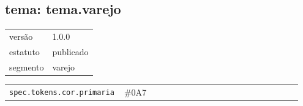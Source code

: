 \subsection*{tema: tema.varejo}
\begin{tabular}{@{}ll@{}}
versão & 1.0.0 \\
estatuto & publicado \\
segmento & varejo \\
\end{tabular}

\begin{tabular}{@{}p{0.35\linewidth}p{0.6\linewidth}@{}}
\texttt{spec.tokens.cor.primaria} & \#0A7 \\
\end{tabular}
